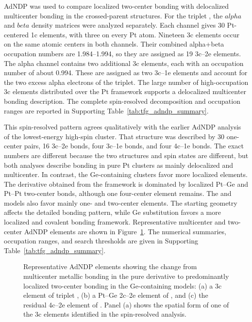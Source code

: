 AdNDP was used to compare localized two-center bonding with delocalized
multicenter bonding in the crossed-parent structures.\cite{zubarev:adndp:2008,
tkachenko:adndp2:2019}
For the triplet , the $alpha$ and $beta$ density
matrices were analyzed separately. Each channel gives 30 Pt-centered 1c
elements, with three on every Pt atom. Nineteen 3c elements occur on the same
atomic centers in both channels. Their combined alpha+beta occupation numbers
are 1.984--1.994, so they are assigned as 19 3c--2e elements. The alpha
channel contains two additional 3c elements, %
each with an occupation number of about 0.994. These are
assigned as two 3c--1e elements and account for the two excess alpha electrons
of the triplet. The large number of high-occupation 3c elements distributed
over the Pt framework supports a delocalized multicenter bonding description.
The complete spin-resolved decomposition and occupation ranges are reported
in Supporting Table~\ref{tab:tfg_adndp_summary}.

This spin-resolved pattern agrees qualitatively with the earlier AdNDP analysis of the
lowest-energy high-spin  cluster. That structure was described by 30
one-center pairs, 16 3c--2e bonds, four 3c--1e bonds, and four 4c--1e
bonds.\cite{ugartemendia:2022} The exact numbers are different because the two
 structures and spin states are different, but both analyses describe
bonding in pure Pt clusters as mainly delocalized and multicenter.
In contrast, the Ge-containing clusters favor more localized elements. The 
derivative obtained from the  framework is dominated by localized
Pt--Ge and Pt--Pt two-center bonds, although one four-center element remains.
The  and  models also favor mainly one- and two-center
elements. The starting geometry affects the detailed bonding pattern, while
Ge substitution favors a more localized and covalent bonding framework.
Representative multicenter and two-center AdNDP elements are shown in
Figure~\ref{fig:tfg_adndp_comparison}. The numerical summaries, occupation
ranges, and search thresholds are given in Supporting Table~\ref{tab:tfg_adndp_summary}.

\begin{figure}[H]
\centering

\caption{Representative AdNDP elements showing the change from multicenter
metallic bonding in the pure  derivative to predominantly localized
two-center bonding in the Ge-containing models: (a) a 3c element of triplet
, (b) a Pt--Ge 2c--2e element of , and (c) the residual
4c--2e element of . Panel (a) shows the spatial form of one of the
3c elements identified in the spin-resolved analysis.}
\label{fig:tfg_adndp_comparison}
\end{figure}




